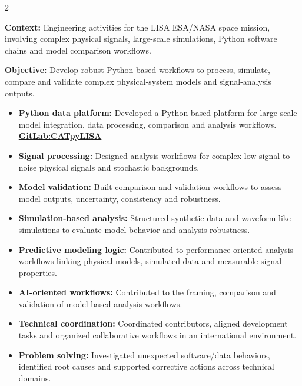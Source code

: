 \documentclass[8pt,a4paper,ragged2e,withhyper]{altacv}
\begin{document}
\begin{paracol}{2}
\divider


\textbf{Context:} Engineering activities for the LISA ESA/NASA space mission, involving complex physical signals, large-scale simulations, Python software chains and model comparison workflows.

\textbf{Objective:} Develop robust Python-based workflows to process, simulate, compare and validate complex physical-system models and signal-analysis outputs.

\begin{itemize}
\item \textbf{Python data platform:} Developed a Python-based platform for large-scale model integration, data processing, comparison and analysis workflows. \textcolor{DarkPastelRed}{\href{https://gitlab.oca.eu/gboileau/lisa_l3_tools}{\bf GitLab:CATpyLISA}}
\item \textbf{Signal processing:} Designed analysis workflows for complex low signal-to-noise physical signals and stochastic backgrounds.
\item \textbf{Model validation:} Built comparison and validation workflows to assess model outputs, uncertainty, consistency and robustness.
\item \textbf{Simulation-based analysis:} Structured synthetic data and waveform-like simulations to evaluate model behavior and analysis robustness.
\item \textbf{Predictive modeling logic:} Contributed to performance-oriented analysis workflows linking physical models, simulated data and measurable signal properties.
\item \textbf{AI-oriented workflows:} Contributed to the framing, comparison and validation of model-based analysis workflows.
\item \textbf{Technical coordination:} Coordinated contributors, aligned development tasks and organized collaborative workflows in an international environment.
\item \textbf{Problem solving:} Investigated unexpected software/data behaviors, identified root causes and supported corrective actions across technical domains.
\end{itemize}

\divider



\end{paracol}
\end{document}

